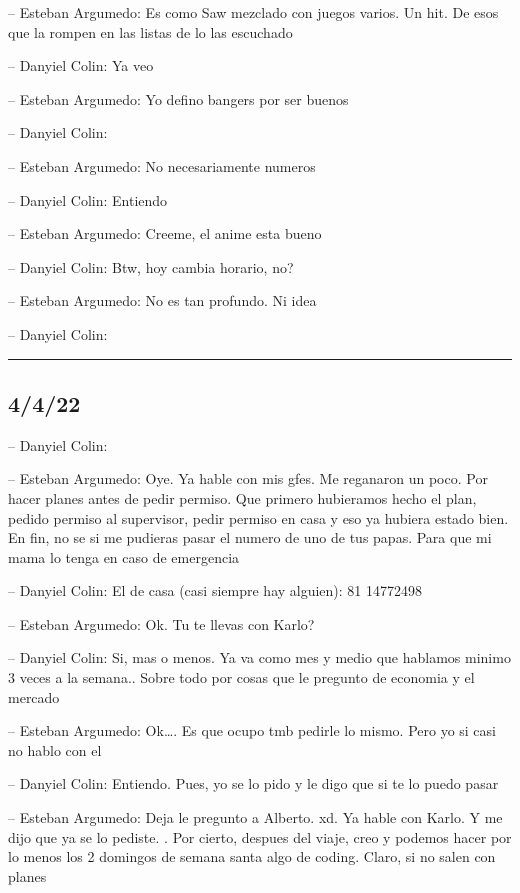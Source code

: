 -- Esteban Argumedo: Es como Saw mezclado con juegos varios. Un hit. De
esos que la rompen en las listas de lo las escuchado

-- Danyiel Colin: Ya veo

-- Esteban Argumedo: Yo defino bangers por ser buenos

-- Danyiel Colin:

-- Esteban Argumedo: No necesariamente numeros

-- Danyiel Colin: Entiendo

-- Esteban Argumedo: Creeme, el anime esta bueno

-- Danyiel Colin: Btw, hoy cambia horario, no?

-- Esteban Argumedo: No es tan profundo. Ni idea

-- Danyiel Colin:

\begin{center}\rule{0.5\linewidth}{0.5pt}\end{center}

\hypertarget{section-48}{%
\subsection{4/4/22}\label{section-48}}

-- Danyiel Colin:

-- Esteban Argumedo: Oye. Ya hable con mis gfes. Me reganaron un poco.
Por hacer planes antes de pedir permiso. Que primero hubieramos hecho el
plan, pedido permiso al supervisor, pedir permiso en casa y eso ya
hubiera estado bien. En fin, no se si me pudieras pasar el numero de uno
de tus papas. Para que mi mama lo tenga en caso de emergencia

-- Danyiel Colin: El de casa (casi siempre hay alguien): 81 14772498

-- Esteban Argumedo: Ok. Tu te llevas con Karlo?

-- Danyiel Colin: Si, mas o menos. Ya va como mes y medio que hablamos
minimo 3 veces a la semana.. Sobre todo por cosas que le pregunto de
economia y el mercado

-- Esteban Argumedo: Ok\ldots. Es que ocupo tmb pedirle lo mismo. Pero
yo si casi no hablo con el

-- Danyiel Colin: Entiendo. Pues, yo se lo pido y le digo que si te lo
puedo pasar

-- Esteban Argumedo: Deja le pregunto a Alberto. xd. Ya hable con Karlo.
Y me dijo que ya se lo pediste. . Por cierto, despues del viaje, creo y
podemos hacer por lo menos los 2 domingos de semana santa algo de
coding. Claro, si no salen con planes

